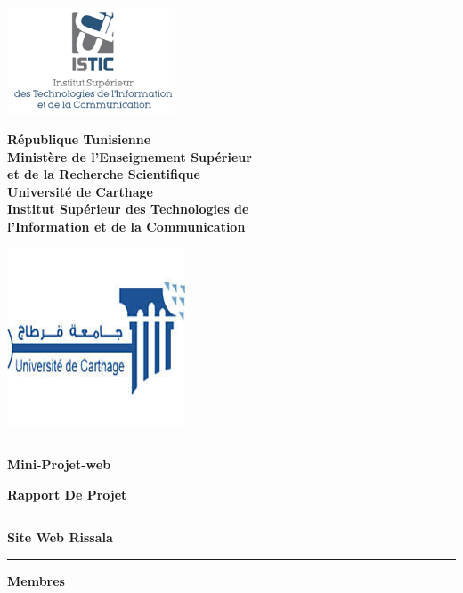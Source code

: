 \documentclass[a4paper, 12pt, twoside]{report}
\begin{document}
\begin{titlepage}
\includegraphics[width = 50mm]{image/istic.png} \hfill
\begin{minipage}[b][3.00 \baselineskip]{20 em}
    \centering
    \textbf{République Tunisienne \\
    Ministère de l’Enseignement Supérieur \\
    et de la Recherche Scientifique \\
    Université de Carthage \\
    Institut Supérieur des Technologies de \\
    l’Information et de la Communication }
\end{minipage} \hfill  \includegraphics[width = 0.20 \textwidth]{image/car.jpg}  
\vspace{1.5 cm}
\hrule

\vspace{3 cm}
\begin{center}
\LARGE{\textbf{Mini-Projet-web}}
\end{center}

\vspace{0.1 cm}
\begin{center}
\LARGE{\textbf{Rapport De Projet}}
\end{center}

\vspace{1.3 cm}
\hrule
\begin{center}
\huge{\textbf{Site Web Rissala}}
\end{center}
\hrule

\vspace{1.5 cm}
\begin{center}
\LARGE{\textbf{Membres}}
\end{center}


\end{titlepage}
\end{document}

